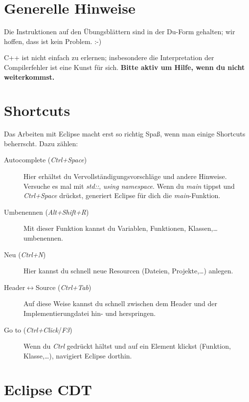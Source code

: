 

\newcommand{\tag}{1}

\cppSetTitle



\cppSetHeaderAndMakeTitle 


\section*{Generelle Hinweise}

Die Instruktionen auf den Übungsblättern sind in der Du-Form gehalten; wir hoffen, dass ist kein Problem. :-)

C++ ist nicht einfach zu erlernen; insbesondere die Interpretation der Compilerfehler ist eine Kunst für sich.
\textbf{Bitte aktiv um Hilfe, wenn du nicht weiterkommst.}

\section*{Shortcuts}

Das Arbeiten mit Eclipse macht erst so richtig Spaß, wenn man einige Shortcuts beherrscht.
Dazu zählen:
\begin{description}
	\item[Autocomplete (\emph{Ctrl+Space})]
	Hier erhältst du Vervollständigungsvorschläge und andere Hinweise.
	Versuche es mal mit \emph{std::}, \emph{using namespace}.
	Wenn du \emph{main} tippst und \emph{Ctrl+Space} drückst, generiert Eclipse für dich die \emph{main}-Funktion.
	
	\item[Umbenennen (\emph{Alt+Shift+R})]
	Mit dieser Funktion kannst du Variablen, Funktionen, Klassen,\dots umbenennen.
	
	\item[Neu (\emph{Ctrl+N})]
	Hier kannst du schnell neue Resourcen (Dateien, Projekte,\dots) anlegen.
	
	\item[Header$\leftrightarrow$Source (\emph{Ctrl+Tab})]
	Auf diese Weise kannst du schnell zwischen dem Header und der Implementierungdatei hin- und herspringen.
	
	\item[Go to (\emph{Ctrl+Click}/\emph{F3})] Wenn du \emph{Ctrl} gedrückt hältst und auf ein Element klickst (Funktion, Klasse,\dots), navigiert Eclipse dorthin.
\end{description}

\section{Eclipse CDT}

